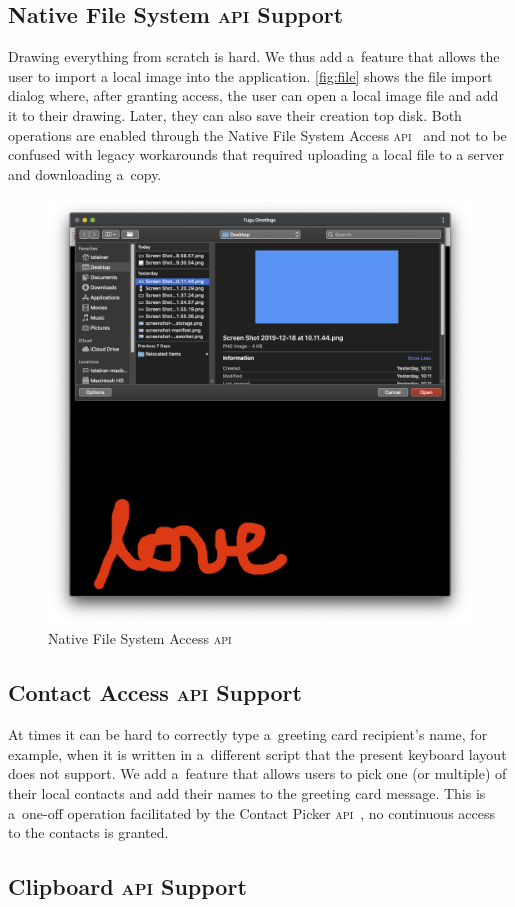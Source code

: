 \documentclass[sigconf, anonymous]{acmart}
\begin{document}
\subsection{Native File System \textsc{api} Support}

Drawing everything from scratch is hard.
We thus add a~feature that allows the user to import a local image into the application.
\autoref{fig:file} shows the file import dialog where, after granting access,
the user can open a local image file and add it to their drawing.
Later, they can also save their creation top disk.
Both operations are enabled through the Native File System Access \textsc{api}~\cite{kruisselbrink19}
and not to be confused with legacy workarounds that required uploading a local file to a server
and downloading a~copy.

\begin{figure}[hbt]
  \includegraphics[width=0.5\columnwidth]{file.png}
  \caption{Native File System Access \textsc{api}}
  \label{fig:file}
\end{figure}

\subsection{Contact Access \textsc{api} Support}

At times it can be hard to correctly type a~greeting card recipient's name,
for example, when it is written in a~different script
that the present keyboard layout does not support.
We add a~feature that allows users to pick one (or multiple) of their local contacts
and add their names to the greeting card message.
This is a~one-off operation facilitated by the Contact Picker \textsc{api}~\cite{beverloo19},
no continuous access to the contacts is granted.

\subsection{Clipboard \textsc{api} Support}
\end{document}
